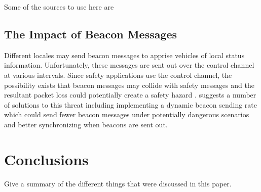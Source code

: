 \documentclass[twoside,conference]{IEEEtran}
\begin{document}
		Some of the sources to use here are \cite{Lansford2013,Chang2013,Toyota2013,NTIA2013}
		
	\subsection{The Impact of Beacon Messages}\label{sec:beacons}
		Different locales may send beacon messages to apprise vehicles of local status information. Unfortunately, these messages are sent out over the control channel at various intervals. Since safety applications use the control channel, the possibility exists that beacon messages may collide with safety messages and the resultant packet loss could potentially create a safety hazard \cite{Doukha2015}. \cite{Doukha2015} suggests a number of solutions to this threat including implementing a dynamic beacon sending rate which could send fewer beacon messages under potentially dangerous scenarios and better synchronizing when beacons are sent out.

\section{Conclusions}\label{sec:conclusions}
	Give a summary of the different things that were discussed in this paper.



\end{document}
